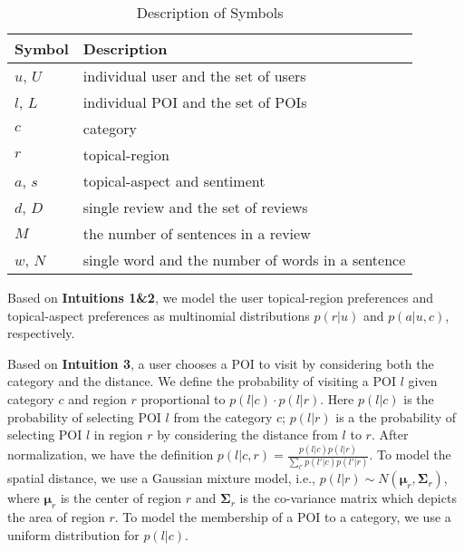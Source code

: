 \begin{table}[th]
\centering
\caption{Description of Symbols}
\begin{tabular}{l|l}
\hline
 Symbol & Description\\
\hline
$u$, $U$ & individual user and the set of users\\
\hline
$l$, $L$ & individual POI and the set of POIs  \\
\hline
$c$ & category  \\
\hline
$r$ & topical-region  \\
\hline
$a$, $s$ & topical-aspect and sentiment \\
\hline
$d$, $D$ & single review and the set of reviews \\
\hline
$M$ & the number of sentences in a review \\
\hline
$w$, $N$ & single word and the number of words in a sentence \\
\hline
\end{tabular}
\label{tab:notation}
\end{table}

Based on \textbf{Intuitions 1\&2}, we model the user
topical-region preferences and topical-aspect preferences
as multinomial distributions $p(r|u)$ and $p(a|u,c)$, respectively.

Based on \textbf{Intuition 3}, a user chooses a POI to visit
by considering both the category and the distance. We
define the probability of visiting a POI $l$ given
category $c$ and region $r$ proportional to $p(l|c)\cdot p(l|r)$.
Here $p(l|c)$ is the probability of selecting POI $l$ from
the category $c$; $p(l|r)$ is a the probability
of selecting POI $l$ in region $r$ by considering
the distance from $l$ to $r$. After normalization, we have the
definition $p(l|c,r)=\frac{p(l|c)p(l|r)}{\sum_{l'}{p(l'|c)p(l'|r)}}$.
To model the spatial distance, we use a
Gaussian mixture model, i.e.,
$p(l|r)\sim N(\boldsymbol{\mu}_r, \boldsymbol{\Sigma}_r)$, where
$\boldsymbol{\mu}_r$ is the center of region $r$ and
$\boldsymbol{\Sigma}_r$ is the co-variance matrix which depicts the
area of region $r$.
To model the membership of a POI to a category, we use a uniform
distribution for $p(l|c)$.

